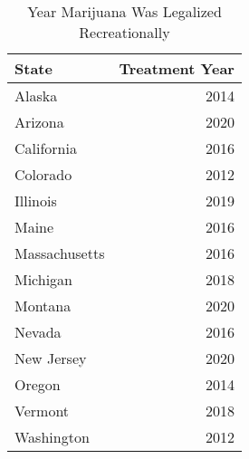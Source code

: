 \begin{table} \centering
\caption{Year Marijuana Was Legalized Recreationally}
\label{}
\begin{tabular}[t]{l|r}
\hline
State & Treatment Year\\
\hline
Alaska & 2014\\
\hline
Arizona & 2020\\
\hline
California & 2016\\
\hline
Colorado & 2012\\
\hline
Illinois & 2019\\
\hline
Maine & 2016\\
\hline
Massachusetts & 2016\\
\hline
Michigan & 2018\\
\hline
Montana & 2020\\
\hline
Nevada & 2016\\
\hline
New Jersey & 2020\\
\hline
Oregon & 2014\\
\hline
Vermont & 2018\\
\hline
Washington & 2012\\
\hline
\end{tabular}
\end{table}